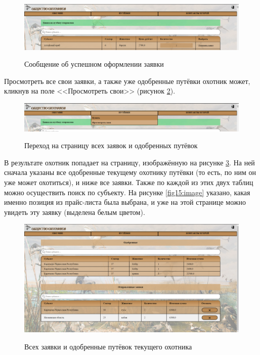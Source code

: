 	\begin{figure}[h]
		\centering
		\begin{center}
			{\includegraphics[scale=0.34]{schemes/screens/msg_right.png}}
			\caption{Сообщение об успешном оформлении заявки}
			\label{fig16:image}
		\end{center}
	\end{figure}

	Просмотреть все свои заявки, а также уже одобренные путёвки охотник может, кликнув на поле <<Просмотреть свои>> (рисунок \ref{fig17:image}).
	
	\begin{figure}[h]
		\centering
		\begin{center}
			{\includegraphics[scale=0.34]{schemes/screens/to_have.png}}
			\caption{Переход на страницу всех заявок и одобренных путёвок}
			\label{fig17:image}
		\end{center}
	\end{figure}

	В результате охотник попадает на страницу, изображённую на рисунке \ref{fig18:image}. На ней сначала указаны все одобренные текущему охотнику путёвки (то есть, по ним он уже может охотиться), и ниже все заявки. Также по каждой из этих двух таблиц можно осуществить поиск по субъекту. На рисунке \ref{fig15:image} указано, какая именно позиция из прайс-листа была выбрана, и уже на этой странице можно увидеть эту заявку (выделена белым цветом).
	
	\begin{figure}[h]
		\centering
		\begin{center}
			{\includegraphics[scale=0.34]{schemes/screens/all_vouchers.png}}
			\caption{Всех заявки и одобренные путёвок текущего охотника}
			\label{fig18:image}
		\end{center}
	\end{figure}

